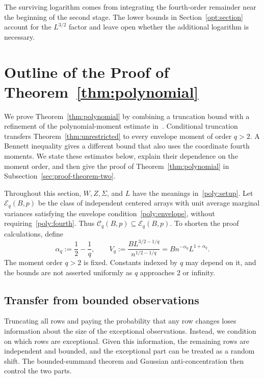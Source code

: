 \documentclass[11pt,letterpaper]{article}
\theoremstyle{remark}
\begin{document}
The surviving logarithm comes from integrating the fourth-order
remainder near the beginning of the second stage. The lower bounds in
Section~\ref{opt:section} account for the \(L^{3/2}\) factor and leave
open whether the additional logarithm is necessary.

\section{Outline of the Proof of Theorem~\ref*{thm:polynomial}}\label{sec:poly}

We prove Theorem~\ref{thm:polynomial} by combining a truncation bound
with a refinement of the polynomial-moment estimate in~\cite{CCKK2022}.
Conditional truncation transfers Theorem~\ref{thm:unrestricted} to
every envelope moment of order \(q>2\). A Bennett inequality gives a
different bound that also uses the coordinate fourth moments.
We state these estimates below, explain their dependence on the moment
order, and then give the proof of Theorem~\ref{thm:polynomial} in
Subsection~\ref{sec:proof-theorem-two}.

Throughout this section, \(W,Z,\Sigma\), and \(L\) have the meanings
in~\eqref{poly:setup}. Let \(\mathcal E_q(B,p)\) be the class of
independent centered arrays with unit average marginal variances
satisfying the envelope condition~\eqref{poly:envelope}, without
requiring~\eqref{poly:fourth}. Thus
\(\mathcal C_q(B,p)\subseteq\mathcal E_q(B,p)\).
To shorten the proof calculations, define
\begin{equation}
 \alpha_q:=\frac12-\frac1q,\qquad
 V_q:=\frac{B L^{3/2-1/q}}{n^{1/2-1/q}}
      =Bn^{-\alpha_q}L^{1+\alpha_q}.
 \label{poly:rates}
\end{equation}
The moment order \(q>2\) is fixed. Constants indexed by \(q\)
may depend on it, and the bounds are not asserted uniformly as
\(q\) approaches \(2\) or infinity.

\subsection{Transfer from bounded observations}\label{poly:transfer-sec}

Truncating all rows and paying the probability that any row changes
loses information about the size of the exceptional observations.
Instead, we condition on which rows are exceptional. Given this
information, the remaining rows are independent and bounded, and the
exceptional part can be treated as a random shift. The bounded-summand
theorem and Gaussian anti-concentration then control the two parts.
\end{document}

